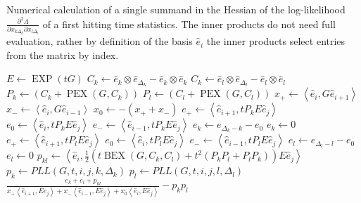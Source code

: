 \begin{algorithm}[!ht]
	\caption[Single summand in $\frac{\partial^2 \Lambda}{\partial x_{k \Delta_k} \partial x_{l \Delta_l}}$]{Numerical calculation of a single summand in the Hessian of the log-likelihood $\frac{\partial^2 \Lambda}{\partial x_{k \Delta_k} \partial x_{l \Delta_l}}$ of a first hitting time statistics. The inner products do not need full evaluation, rather by definition of the basis $\hat{e}_i$ the inner products select entries from the matrix by index.}
	\label{alg:secondpartial}
	\begin{algorithmic}[1]
			\State $E \gets \operatorname{EXP}\left(tG\right)$
			\State $C_k \gets \hat{e}_k \otimes \hat{e}_{\Delta_k} - \hat{e}_k \otimes \hat{e}_k$
			\State $C_k \gets \hat{e}_l \otimes \hat{e}_{\Delta_l} - \hat{e}_l \otimes \hat{e}_l$
			\State $P_k \gets \left(C_k + \operatorname{PEX}\left(G,C_k\right)\right)$
			\State $P_l \gets \left(C_l + \operatorname{PEX}\left(G,C_l\right)\right)$
			\State $x_{+} \gets \left\langle \hat{e}_i , G \hat{e}_{i+1} \right\rangle$
			\State $x_{-} \gets \left\langle \hat{e}_i , G \hat{e}_{i-1} \right\rangle$
			\State $x_0 \gets -\left(x_{+} + x_{-}\right)$
				\State $e_{+} \gets \left\langle \hat{e}_{i+1}, t P_k E \hat{e}_j \right\rangle$
				\State $e_0 \gets \left\langle \hat{e}_i, t P_k E \hat{e}_j \right\rangle$
				\State $e_{-} \gets \left\langle \hat{e}_{i-1}, t P_k E \hat{e}_j \right\rangle$
				\State $e_k \gets e_{\Delta_k - k} - e_0 $
			\Else
				\State $e_k \gets 0$
			\EndIf
				\State $e_{+} \gets \left\langle \hat{e}_{i+1}, t P_l E \hat{e}_j \right\rangle$
				\State $e_0 \gets \left\langle \hat{e}_i, t P_l E \hat{e}_j \right\rangle$
				\State $e_{-} \gets \left\langle \hat{e}_{i-1}, t P_l E \hat{e}_j \right\rangle$
				\State $e_l \gets e_{\Delta_l - l} - e_0$
			\Else
				\State $e_l \gets 0$
			\EndIf
			\State $p_{kl} \gets \left\langle \hat{e}_i, \frac{1}{2}\left(t \operatorname{BEX}\left(G,C_k,C_l\right) +  t^2 \left(P_k P_l + P_l P_k\right)\right) E \hat{e}_j \right\rangle$
			\State $p_k \gets PLL\left(G,t,i,j,k,\Delta_k\right)$
			\State $p_l \gets PLL\left(G,t,i,j,l,\Delta_l\right)$
			\State \Return $\frac{e_k+e_l+p_{kl}}{x_{+} \left\langle \hat{e}_{i+1}, E \hat{e}_j \right\rangle + x_{-} \left\langle \hat{e}_{i-1}, E \hat{e}_j \right\rangle + x_0 \left\langle \hat{e}_i, E \hat{e}_j \right\rangle}-p_k p_l$
		\EndFunction
	\end{algorithmic}
\end{algorithm}